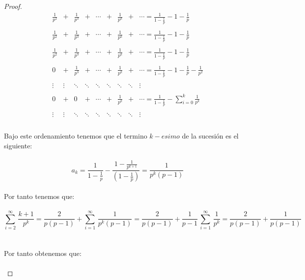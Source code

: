 \documentclass[11pt,letterpaper]{article}
\begin{document}
\begin{proof}
\,\\
\begin{equation*}
\begin{matrix}
    \frac{1}{p^2}&+&\frac{1}{p^3}&+&\cdots&+&\frac{1}{p^k}&+&\cdots=\frac{1}{1-\frac{1}{p}}-1-\frac{1}{p}\\
    \,\\
    \frac{1}{p^2}&+&\frac{1}{p^3}&+&\cdots&+&\frac{1}{p^k}&+&\cdots=\frac{1}{1-\frac{1}{p}}-1-\frac{1}{p}\\
    \,\\
    \frac{1}{p^2}&+&\frac{1}{p^3}&+&\cdots&+&\frac{1}{p^k}&+&\cdots=\frac{1}{1-\frac{1}{p}}-1-\frac{1}{p}\\
    \,\\
    0&+&\frac{1}{p^3}&+&\cdots&+&\frac{1}{p^k}&+&\cdots=\frac{1}{1-\frac{1}{p}}-1-\frac{1}{p}-\frac{1}{p^2}\\
    \,\\
    \vdots & \vdots & \ddots & \ddots &\ddots &\ddots &\ddots &\ddots &\vdots\\
    \,\\
    0&+&0&+&\cdots&+& \frac{1}{p^k}&+&\cdots=\frac{1}{1-\frac{1}{p}}-\sum_{i=0}^{k}\frac{1}{p^k}\\
    \,\\
     \vdots & \vdots & \ddots & \ddots &\ddots &\ddots &\ddots &\ddots &\vdots\\
\end{matrix}
\end{equation*}\,\\
Bajo este ordenamiento tenemos que el termino $k-esimo$ de la sucesi\'on es el siguiente:\,\\
\,\\
\begin{equation*}
    a_k=\frac{1}{1-\frac{1}{p}}-\frac{1-\frac{1}{p^{k+1}}}{(1-\frac{1}{p})}=\frac{1}{p^k(p-1)}
\end{equation*}\,\\
Por tanto tenemos que:\,\\
\,\\
\begin{equation*}
    \sum_{i=2}^{\infty}\,\frac{k+1}{p^k}=\frac{2}{p(p-1)}+\sum_{i=1}^{\infty}\,\frac{1}{p^k(p-1)}=\frac{2}{p(p-1)}+\frac{1}{p-1}\,\sum_{i=1}^{\infty}\,\frac{1}{p^k}=\frac{2}{p(p-1)}+\frac{1}{p(p-1)}
\end{equation*}\,\\
 \,\\
Por tanto obtenemos que:\,\\
\,\\

\end{proof}
\end{document}
